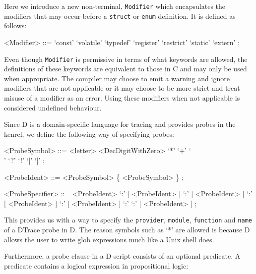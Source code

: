 \noindent
Here we introduce a new non-terminal, \texttt{Modifier} which encapsulates the
modifiers that may occur before a \texttt{struct} or \texttt{enum} definition.
It is defined as follows:

\begin{grammar}
<Modifier> ::= `const'
	\alt `volatile'
	\alt `typedef'
	\alt `register'
	\alt `restrict'
	\alt `static'
	\alt `extern' ;
\end{grammar}

\noindent
Even though \texttt{Modifier} is permissive in terms of what keywords are
allowed, the definitions of these keywords are equivalent to those in C and may
only be used when appropriate. The compiler may choose to emit a warning and
ignore modifiers that are not applicable or it may choose to be more strict and
treat misuse of a modifier as an error. Using these modifiers when not
applicable is considered undefined behaviour. \newline

\noindent
Since D is a domain-specific language for tracing and provides probes in the
kenrel, we define the following way of specifying probes:

\begin{grammar}
<ProbeSymbol> ::= <letter>
	\alt <DecDigitWithZero>
	\alt `*'
	\alt `+'
	\alt `\\'
	\alt `?'
	\alt `!'
	\alt `['
	\alt `]' ;

<ProbeIdent> ::= <ProbeSymbol> \{ <ProbeSymbol> \} ;

<ProbeSpecifier> ::= <ProbeIdent>
	\alt [ <ProbeIdent> ] `:' [ <ProbeIdent> ]
	\alt [ <ProbeIdent> ] `:' [ <ProbeIdent> ] `:' [ <ProbeIdent> ]
	\alt [ <ProbeIdent> ] `:' [ <ProbeIdent> ] `:' \newline
	[ <ProbeIdent> ] `:' [ <ProbeIdent> ] ;
\end{grammar}

\noindent
This provides us with a way to specify the \texttt{provider}, \texttt{module},
\texttt{function} and \texttt{name} of a DTrace probe in D. The reason symbols
such as `*' are allowed is because D allows the user to write glob expressions
much like a Unix shell does. \newline

\noindent
Furthermore, a probe clause in a D script consists of an optional predicate. A
predicate contains a logical expression in propositional logic:

